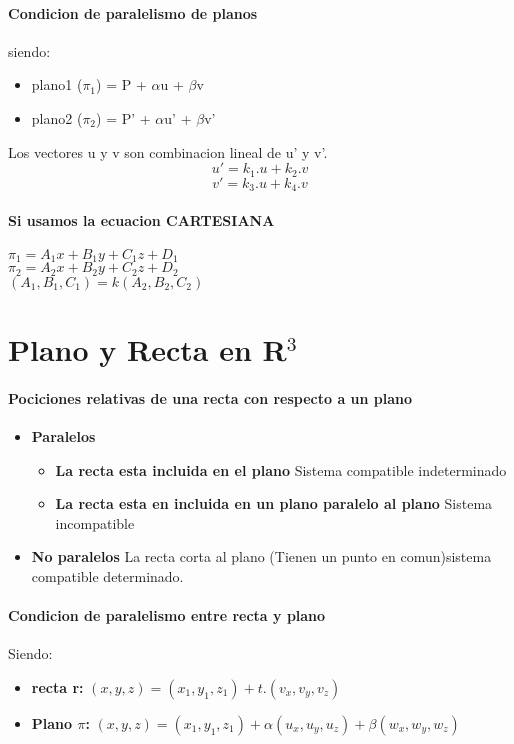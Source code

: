 \documentclass[11pt]{article}
\begin{document}
\paragraph{Condicion de paralelismo de planos}
siendo:
\begin{itemize}
	\item plano1 ($\pi_1$) = P + $\alpha$u + $\beta$v
	\item plano2 ($\pi_2$) = P' + $\alpha$u' + $\beta$v'
\end{itemize}
Los vectores u y v son combinacion lineal de u' y v'.
\begin{equation*}
	u' = k_1.u + k_2.v
\end{equation*}
\begin{equation*}
	v' = k_3.u + k_4.v
\end{equation*}
\paragraph{Si usamos la ecuacion CARTESIANA}
$\pi_1 = A_1x + B_1y + C_1z + D_1 $ \\
$ \pi_2 = A_2x + B_2y + C_2z + D_2$ \\
$(A_1, B_1, C_1) = k(A_2, B_2, C_2)$
\pagebreak
\section{Plano y Recta en R$^3$}
\paragraph{Pociciones relativas de una recta con respecto a un plano}
\begin{itemize}
	\item \textbf{Paralelos}
	\begin{itemize}
		\item \textbf{La recta esta incluida en el plano} Sistema compatible indeterminado
		\item \textbf{La recta esta en incluida en un plano paralelo al plano} Sistema incompatible
	\end{itemize}
	\item \textbf{No paralelos} La recta corta al plano (Tienen un punto en comun)sistema compatible determinado.
\end{itemize}
\paragraph{Condicion de paralelismo entre recta y plano}
Siendo:
\begin{itemize}
	\item \textbf{recta r: } $(x, y , z) = (x_1, y_1, z_1) + t.(v_x, v_y, v_z)$
	\item \textbf{Plano $\pi$: }$(x, y, z) = (x_1, y_1, z_1) + \alpha(u_x, u_y, u_z) + \beta(w_x, w_y, w_z)$ 
\end{itemize}
\end{document}
